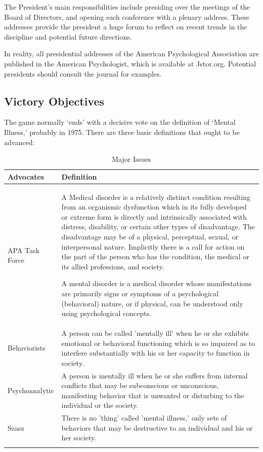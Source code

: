 The President's main responsibilities include presiding over the meetings of the Board of Directors, and opening each conference with a plenary address. These addresses provide the president a huge forum to reflect on recent trends in the discipline and potential future directions.

In reality, all presidential addresses of the American Psychological Association are published in the American Psychologist, which is available at Jstor.org. Potential presidents should consult the journal for examples.

\subsection{Victory Objectives}
\label{victoryobjectives}

The game normally `ends' with a decisive vote on the definition of `Mental Illness,' probably in 1975. There are three basic definitions that ought to be advanced:
 \begin{longtable}[!t]{ | p{2cm} | p{12cm} | }
\hline

\textbf{Advocates}&\textbf{Definition}\\ \hline
APA Task Force&A Medical disorder is a relatively distinct condition resulting from an organismic dysfunction which in its fully developed or extreme form is directly and intrinsically associated with distress, disability, or certain other types of disadvantage.  The disadvantage may be of a physical, perceptual, sexual, or interpersonal nature. Implicitly there is a call for action on the part of the person who has the condition, the medical or its allied professions, and society.

A mental disorder is a medical disorder whose manifestations are primarily signs or symptoms of a psychological (behavioral) nature, or if physical, can be understood only using psychological concepts.\\ \hline
Behaviorists& A person can be called 'mentally ill' when he or she exhibits emotional or behavioral functioning which is so impaired as to interfere substantially with his or her capacity to function in society. \\ \hline
Psychoanalytic&A person is mentally ill when he or she suffers from internal conflicts that may be subconscious or unconscious, manifesting behavior that is unwanted or disturbing to the individual or the society. \\ \hline
Szasz&There is no 'thing' called 'mental illness,' only  sets of behaviors that may be destructive to an individual and his or her society. \\ \hline
 
\caption{Major Issues}
\label{table: major issues}
\end{longtable}

